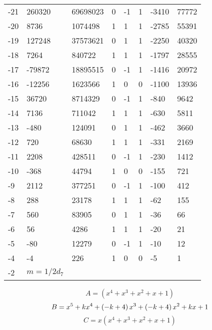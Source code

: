 \documentclass{amsart}
\begin{document}
\begin{longtable}{|l|l|l|lllll|}
-21&260320&69698023&0&-1&1&-3410&77772\\
-20&8736&1074498&1&1&1&-2785&55391\\
-19&127248&37573621&0&1&1&-2250&40320\\
-18&7264&840722&1&1&1&-1797&28555\\
-17&-79872&18895515&0&-1&1&-1416&20972\\
-16&-12256&1623566&1&0&0&-1100&13936\\
-15&36720&8714329&0&-1&1&-840&9642\\
-14&7136&711042&1&1&1&-630&5811\\
-13&-480&124091&0&1&1&-462&3660\\
-12&720&68630&1&1&1&-331&2169\\
-11&2208&428511&0&-1&1&-230&1412\\
-10&-368&44794&1&0&0&-155&721\\
-9&2112&377251&0&-1&1&-100&412\\
-8&288&23178&1&1&1&-62&155\\
-7&560&83905&0&1&1&-36&66\\
-6&56&4286&1&1&1&-20&21\\
-5&-80&12279&0&-1&1&-10&12\\
-4&-4&226&1&0&0&-5&1\\
-2&$m=1/2d_{7}$&&\multicolumn{5}{c|}{}\\
\hline
\end{longtable}
$$A=(x^4
 + x^3
 + x^2
 + x
 + 1)$$
$$B=x^5
 + k\*x^4
 + \left(-k
 + 4\right) \*x^3
 + \left(-k
 + 4\right) \*x^2
 + k\*x
 + 1$$
$$C=x(x^4
 + x^3
 + x^2
 + x
 + 1)$$
\end{document}
